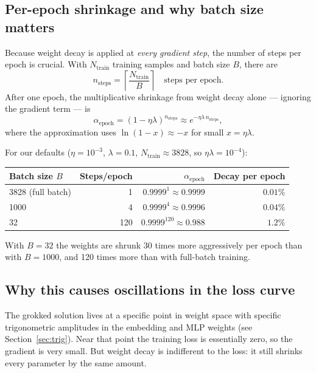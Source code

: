 \documentclass[11pt]{article}
\begin{document}
\subsection{Per-epoch shrinkage and why batch size matters}

Because weight decay is applied at \emph{every gradient step}, the number of
steps per epoch is crucial.  With $N_{\mathrm{train}}$ training samples and
batch size $B$, there are
\begin{equation}
    n_{\mathrm{steps}} = \left\lceil \frac{N_{\mathrm{train}}}{B} \right\rceil
    \quad \text{steps per epoch.}
\end{equation}
After one epoch, the multiplicative shrinkage from weight decay alone ---
ignoring the gradient term --- is
\begin{equation}
    \alpha_{\mathrm{epoch}}
    = (1-\eta\lambda)^{n_{\mathrm{steps}}}
    \approx e^{-\eta\lambda\, n_{\mathrm{steps}}},
    \label{eq:epoch-shrink}
\end{equation}
where the approximation uses $\ln(1-x)\approx -x$ for small $x=\eta\lambda$.

For our defaults ($\eta=10^{-3}$, $\lambda=0.1$, $N_{\mathrm{train}}\approx
3828$, so $\eta\lambda=10^{-4}$):

\begin{center}
\begin{tabular}{lrrr}
\toprule
Batch size $B$ & Steps/epoch & $\alpha_{\mathrm{epoch}}$ & Decay per epoch \\
\midrule
3828 (full batch) & 1   & $0.9999^{1}   \approx 0.9999$ & $0.01\%$ \\
1000              & 4   & $0.9999^{4}   \approx 0.9996$ & $0.04\%$ \\
32                & 120 & $0.9999^{120} \approx 0.988$  & $1.2\%$  \\
\bottomrule
\end{tabular}
\end{center}

With $B=32$ the weights are shrunk 30 times more aggressively per epoch than
with $B=1000$, and 120 times more than with full-batch training.

\subsection{Why this causes oscillations in the loss curve}

The grokked solution lives at a specific point in weight space with specific
trigonometric amplitudes in the embedding and MLP weights
(see Section~\ref{sec:trig}).  Near that point the training loss is
essentially zero, so the gradient is very small.  But weight decay is
indifferent to the loss: it still shrinks every parameter by the same amount.
\end{document}
